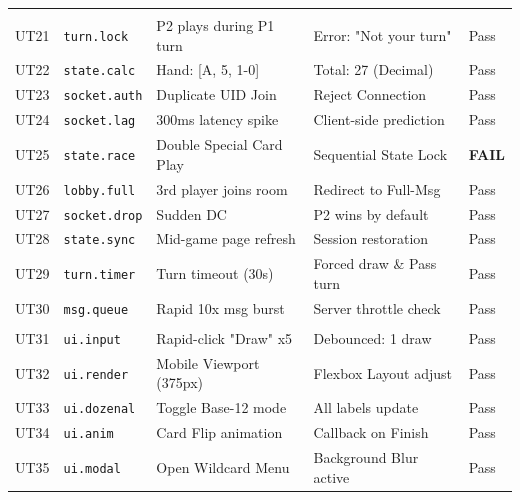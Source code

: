 \documentclass[12pt, titlepage]{article}
\begin{document}
\begin{small}
\begin{xltabular}{\textwidth}{l p{2.2cm} X X l}
            \midrule
              \\
            UT21 & \texttt{turn.lock} & P2 plays during P1 turn & Error: "Not your turn" & Pass \\
            UT22 & \texttt{state.calc} & Hand: [A, 5, 1-0] & Total: 27 (Decimal) & Pass \\
            UT23 & \texttt{socket.auth} & Duplicate UID Join & Reject Connection & Pass \\
            UT24 & \texttt{socket.lag} & 300ms latency spike & Client-side prediction & Pass \\
            UT25 & \texttt{state.race} & Double Special Card Play & Sequential State Lock & \textbf{FAIL} \\
            UT26 & \texttt{lobby.full} & 3rd player joins room & Redirect to Full-Msg & Pass \\
            UT27 & \texttt{socket.drop} & Sudden DC & P2 wins by default & Pass \\
            UT28 & \texttt{state.sync} & Mid-game page refresh & Session restoration & Pass \\
            UT29 & \texttt{turn.timer} & Turn timeout (30s) & Forced draw \& Pass turn & Pass \\
            UT30 & \texttt{msg.queue} & Rapid 10x msg burst & Server throttle check & Pass \\

            \midrule
              \\
            UT31 & \texttt{ui.input} & Rapid-click "Draw" x5 & Debounced: 1 draw & Pass \\
            UT32 & \texttt{ui.render} & Mobile Viewport (375px) & Flexbox Layout adjust & Pass \\
            UT33 & \texttt{ui.dozenal} & Toggle Base-12 mode & All labels update & Pass \\
            UT34 & \texttt{ui.anim} & Card Flip animation & Callback on Finish & Pass \\
            UT35 & \texttt{ui.modal} & Open Wildcard Menu & Background Blur active & Pass \\


\end{xltabular}
\end{small}
\end{document}

